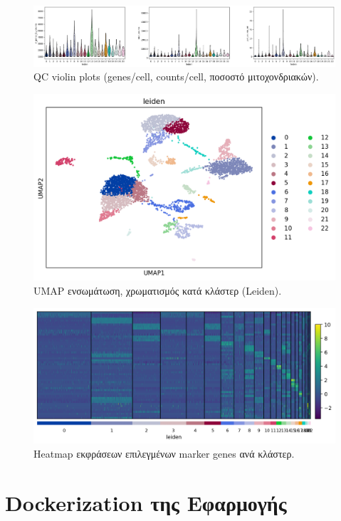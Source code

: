 \documentclass[12pt,a4paper]{article}
\begin{document}
\begin{figure}[H]
  \centering
  \includegraphics[width=0.8\linewidth]{figs/qc_violin.png}
  \caption{QC violin plots (genes/cell, counts/cell, ποσοστό μιτοχονδριακών).}
  \label{fig:qc}
\end{figure}

\begin{figure}[H]
  \centering
  \includegraphics[width=0.8\linewidth]{figs/umap.png}
  \caption{UMAP ενσωμάτωση, χρωματισμός κατά κλάστερ (Leiden).}
  \label{fig:umap}
\end{figure}

\begin{figure}[H]
  \centering
  \includegraphics[width=0.8\linewidth]{figs/markers_heatmap.png}
  \caption{Heatmap εκφράσεων επιλεγμένων marker genes ανά κλάστερ.}
  \label{fig:heatmap}
\end{figure}

\section{Dockerization της Εφαρμογής}
\end{document}
